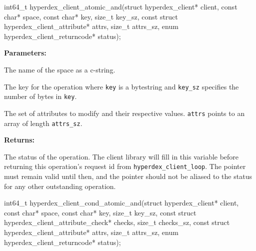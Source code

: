 \funcsep
\begin{ccode}
int64_t hyperdex_client_atomic_and(struct hyperdex_client* client,
                const char* space,
                const char* key, size_t key_sz,
                const struct hyperdex_client_attribute* attrs, size_t attrs_sz,
                enum hyperdex_client_returncode* status);
\end{ccode}
\funcdesc 

\noindent\textbf{Parameters:}
\begin{description}[labelindent=\widthof{{\texttt{attrs}, \texttt{attrs\_sz}}},leftmargin=*,noitemsep,nolistsep,align=right]
\item[\texttt{space}] The name of the space as a c-string.
\item[\texttt{key}, \texttt{key\_sz}] The key for the operation where \texttt{key} is a bytestring and \texttt{key\_sz} specifies the number of bytes in \texttt{key}.
\item[\texttt{attrs}, \texttt{attrs\_sz}] The set of attributes to modify and their respective values.  \texttt{attrs} points to an array of length \texttt{attrs\_sz}.
\end{description}

\noindent\textbf{Returns:}
\begin{description}[labelindent=\widthof{{\texttt{status}}},leftmargin=*,noitemsep,nolistsep,align=right]
\item[\texttt{status}] The status of the operation.  The client library will fill in this variable before returning this operation's request id from \texttt{hyperdex\_client\_loop}.  The pointer must remain valid until then, and the pointer should not be aliased to the status for any other outstanding operation.
\end{description}

\funcsep
\begin{ccode}
int64_t hyperdex_client_cond_atomic_and(struct hyperdex_client* client,
                const char* space,
                const char* key, size_t key_sz,
                const struct hyperdex_client_attribute_check* checks, size_t checks_sz,
                const struct hyperdex_client_attribute* attrs, size_t attrs_sz,
                enum hyperdex_client_returncode* status);
\end{ccode}
\funcdesc 

